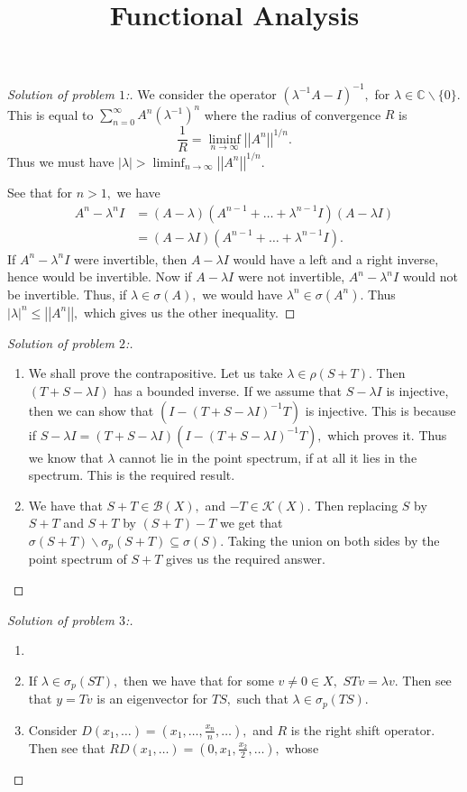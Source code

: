 \documentclass[letterpaper,11pt,twoside]{article}
\title{Functional Analysis}
\theoremstyle{proposition}
\theoremstyle{definition}
\theoremstyle{theorem}
\theoremstyle{definition}
\theoremstyle{definition}
\theoremstyle{definition}
\theoremstyle{lemma}
\theoremstyle{definition}
\theoremstyle{definition}
\theoremstyle{corollary}
\theoremstyle{definition}
\theoremstyle{definition}
\theoremstyle{definition}
\newcommand{\abs}[1]{\left \vert #1 \right \vert}
\newcommand{\norm}[1]{\left \vert \left \vert #1 \right \vert \right \vert}
\begin{document}
	\maketitle
	\begin{proof}[Solution of problem $1$:]
		We consider the operator $(\lambda^{-1}A-I)^{-1},$ for $\lambda \in \mathbb{C} \backslash \{0\}.$ This is equal to $ \sum_{n=0}^{\infty}A^{n} 
		(\lambda^{-1})^n $ where the radius of convergence $R$ is $$\frac{1}{R} = \liminf_{n \to \infty} \norm{A^n}^{1/n}.$$ Thus we must have $ 
		\abs{\lambda} >  \liminf_{n \to \infty} \norm{A^n}^{1/n}.$ 
		
		See that for $n > 1,$ we have 
		\begin{align*}
			A^n - \lambda^nI &= (A- \lambda) (A^{n-1}+ \dots + \lambda^{n-1}I)(A-\lambda I)\\
			&= (A-\lambda I)(A^{n-1}+ \dots + \lambda^{n-1}I).
		\end{align*} 
	If $A^n-\lambda^nI $ were invertible, then $A-\lambda I$ would have a left and a right inverse, hence would be invertible. Now if $A- \lambda I$ were 
	not invertible, $A^n-\lambda^n I$ would not be invertible. Thus, if $\lambda \in \sigma(A),$ we would have $\lambda^n \in \sigma(A^n).$ Thus 
	$\abs{\lambda}^n \leq \norm{A^n},$ which gives us the other inequality.  
	\end{proof}
	\begin{proof}[Solution of problem $2$:]
	\begin{enumerate}
		\item We shall prove the contrapositive. Let us take $\lambda \in \rho (S+T).$ Then $(T+S -\lambda I)$ has a bounded inverse. If we assume that $S- 
		\lambda I $ is injective, then we can show that $ (I-(T+S -\lambda I)^{-1}T )$ is injective. This is because if $S- \lambda I= (T+S -\lambda 
		I)(I-(T+S -\lambda I)^{-1}T ),$ which proves it. Thus we know that $\lambda$ cannot lie in the point spectrum, if at all it lies in the spectrum. 
		This is the required result. 
		\item We have that $S+T \in \mathcal{B}(X),$ and $-T \in \mathcal{K}(X).$ Then replacing $S$ by $S+T$ and $S+T$ by $ (S+T) - T $ we get that $ 
		\sigma(S+T) \backslash \sigma_p(S+T) \subseteq \sigma(S).$ Taking the union on both sides by the point spectrum of $S+T$ gives us the required 
		answer.  
	\end{enumerate}
\end{proof}
	\begin{proof}[Solution of problem $3$:]
	\begin{enumerate}
		\item 
		\item If $\lambda \in \sigma_p(ST),$ then we have that for some $v \neq 0 \in X,$ $STv=\lambda v.$ 
		Then see that $y=Tv$ is an eigenvector for $TS,$ such that $\lambda \in \sigma_p(TS)$.
		\item Consider $D(x_1,\dots)= \left( x_1, \dots, \frac{x_n}{n}, \dots \right),$ and $R$ is the right shift operator. Then see that $RD(x_1, \dots)= 
		( 0 , x_1, \frac{x_2}{2},\dots ),$ whose 
	\end{enumerate}
\end{proof}
\end{document}
